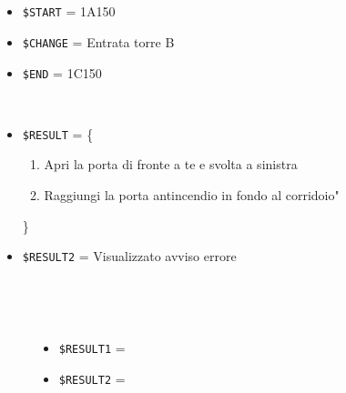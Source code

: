 \documentclass[../../SperimentazioniPratiche.tex]{subfiles}
\begin{document}
			\paragraph*{}	
			\label{Prova3A.1}	
			\begin{tcolorbox}[fonttitle=\bfseries, 
								adjusted title={\Large Prova 3A.1}, 
								breakable, 
								sharp corners=south,
								colback=white, 
								colframe=white!60!black]
								
				\begin{description}[leftmargin=0.7cm,labelwidth=!]
				
					\item[Input] \ \par 
        				\begin{itemize}
        					\item \verb|$START| = 1A150
							\item \verb|$CHANGE| = Entrata torre B
							\item \verb|$END| = 1C150
        				\end{itemize}
        				
        			\tcbline 
        				
        			\item[Output atteso] \ \par
        				\begin{itemize}
        					\item \verb|$RESULT| = \{
        					\begin{enumerate}
        						\item Apri la porta di fronte a te e svolta a sinistra
        						\item Raggiungi la porta antincendio in fondo al corridoio"
        					\end{enumerate}
        					\}
        					\item \verb|$RESULT2| = Visualizzato avviso errore
        				\end{itemize}

					\tcbline        				
        				
        			\item[Output riscontrato] \ \par
        				\begin{description}
        				
        					\item[\dispositivoA] \ \par
        					\begin{itemize}
        						\item \verb|$RESULT1| = \ns
        						\item \verb|$RESULT2| = \ns
        					\end{itemize}      					
        					

\end{description}
\end{description}
\end{tcolorbox}
\end{document}
